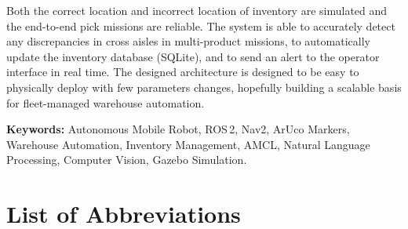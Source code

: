 \documentclass[12pt,a4paper]{report}
\begin{document}
Both the correct location and incorrect location of inventory are simulated and the end-to-end pick missions are reliable. The system is able to accurately detect any discrepancies in cross aisles in multi-product missions, to automatically update the inventory database (SQLite), and to send an alert to the operator interface in real time. The designed architecture is designed to be easy to physically deploy with few parameters changes, hopefully building a scalable basis for fleet-managed warehouse automation.

\bigskip
\noindent\textbf{Keywords:} Autonomous Mobile Robot, ROS\,2, Nav2, ArUco Markers, Warehouse Automation, Inventory Management, AMCL, Natural Language Processing, Computer Vision, Gazebo Simulation.

\newpage

\tableofcontents
\newpage
\listoffigures
{}
\newpage
\listoftables
{}
\newpage

\chapter*{List of Abbreviations}
\end{document}
